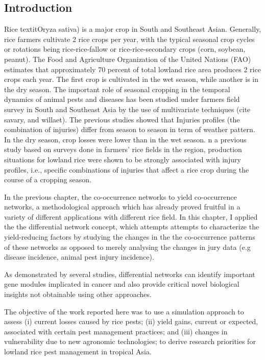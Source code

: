 \subsection{Introduction}

Rice textit{Oryza sativa}) is a major crop in South and Southeast Asian. Generally, rice farmers cultivate 2 rice crops per year, with the typical seasonal crop cycles or rotations being rice-rice-fallow or rice-rice-secondary crops (corn, soybean, peanut). The Food and Agriculture Organization of the United Nations (FAO) estimates that approximately 70 percent of total lowland rice area produces 2 rice crops each year. The first crop is cultivated in the wet season, while another is in the dry season. The important role of seasonal cropping in the temporal dynamics of animal pests and diseases has been studied under farmers field survey in South and Southeast Asia by the use of multivariate techniques (cite savary, and willaet). The previous studies showed that Injuries profiles (the combination of injuries) differ from season to season in term of weather pattern. In the dry season, crop losses were lower than in the wet season. n a previous study based on surveys done in farmers’ rice fields in the region, production situations for lowland rice were shown to be strongly associated with injury profiles, i.e., specific combinations of injuries that affect a rice crop during the course of a cropping season. 

In the previous chapter, the co-occurrence networks to yield co-occurrence networks, a methodological approach which has already proved fruitful in a variety of different applications with different rice field. In this chapter, I applied the the differential network concept, which attempts attempts to characterize the yield-reducing factors by studying the changes in the the co-occurrence patterns of these networks as opposed to merely analysing the changes in jury data (e.g disease incidence, animal pest injury incidence).
 
 As demonstrated by several studies, differential networks can identify important gene modules implicated in cancer and also provide critical novel biological insights not obtainable using other approaches.
 
The objective of the work reported here was to use a simulation  approach to assess (i) current losses caused by rice pests; (ii)  yield gains, current or expected, associated with certain pest management practices; and (iii) changes in vulnerability due to new  agronomic technologies; to derive research priorities for lowland  rice pest management in tropical Asia.


